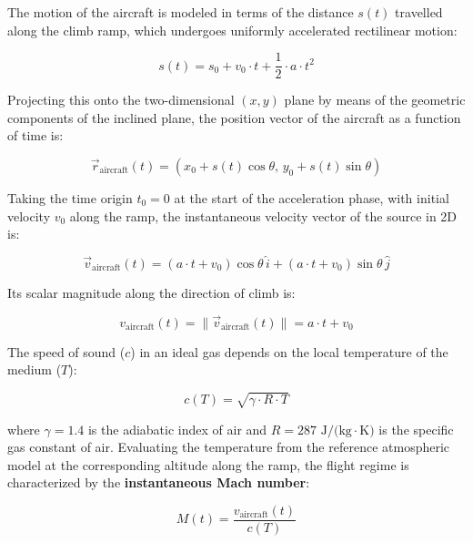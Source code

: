 \documentclass[10.5pt]{article}
\begin{document}
	The motion of the aircraft is modeled in terms of the distance $s(t)$ travelled along the climb ramp, which undergoes uniformly accelerated rectilinear motion:
	
	\begin{equation*}
		s(t) = s_0 + v_0 \cdot t + \frac{1}{2} \cdot a \cdot t^2
	\end{equation*}
	
	Projecting this onto the two-dimensional $(x, y)$ plane by means of the geometric components of the inclined plane, the position vector of the aircraft as a function of time is:
	
	\begin{equation*}
		\vec{r}_{\text{aircraft}}(t) = \left( x_0 + s(t)\cos\theta, \, y_0 + s(t)\sin\theta \right)
	\end{equation*}
	
	Taking the time origin $t_0 = 0$ at the start of the acceleration phase, with initial velocity $v_0$ along the ramp, the instantaneous velocity vector of the source in 2D is:
	
	\begin{equation*}
		\vec{v}_{\text{aircraft}}(t) = (a \cdot t + v_0)\cos\theta \, \hat{i} + (a \cdot t + v_0)\sin\theta \, \hat{j}
	\end{equation*}
	
	Its scalar magnitude along the direction of climb is:
	
	\begin{equation*}
		v_{\text{aircraft}}(t) = \|\vec{v}_{\text{aircraft}}(t)\| = a \cdot t + v_0
	\end{equation*}
	
	The speed of sound ($c$) in an ideal gas depends on the local temperature of the medium ($T$):
	
	\begin{equation*}
		c(T) = \sqrt{\gamma \cdot R \cdot T}
	\end{equation*}
	
	where $\gamma = 1.4$ is the adiabatic index of air and $R = 287\text{ J/(kg}\cdot\text{K)}$ is the specific gas constant of air. Evaluating the temperature from the reference atmospheric model at the corresponding altitude along the ramp, the flight regime is characterized by the \textbf{instantaneous Mach number}:
	
	\begin{equation*}
		M(t) = \frac{v_{\text{aircraft}}(t)}{c(T)}
	\end{equation*}
	
\end{document}
